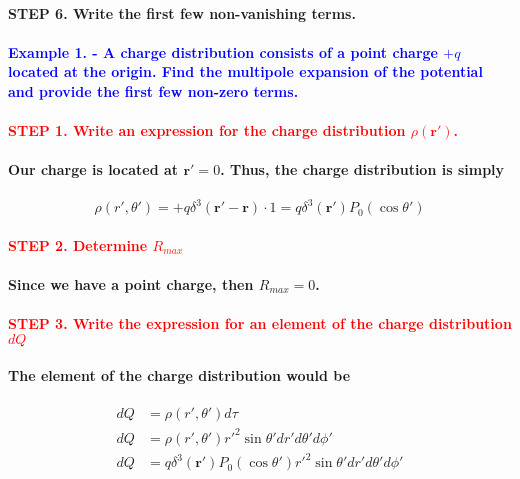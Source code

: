 \documentclass{article}
\begin{document}
\paragraph{STEP 6. Write the first few non-vanishing terms.}
\paragraph{\textcolor{blue}{Example 1. - A charge distribution consists of a point charge $+q$ located at the origin. Find the multipole expansion of the potential and provide the first few non-zero terms.}}
\paragraph{\textcolor{red}{STEP 1. Write an expression for the charge distribution $\rho(\boldsymbol{r}')$.}}
\paragraph{\indent Our charge is located at $\boldsymbol{r}'=0$. Thus, the charge distribution is simply}
\begin{equation*}
    \rho(r',\theta')=+q\delta^3(\boldsymbol{r'-r})\cdot 1=q\delta^3(\boldsymbol{r}')P_0(\cos\theta')
\end{equation*}
\paragraph{\textcolor{red}{STEP 2. Determine $R_{max}$}}
\paragraph{\indent Since we have a point charge, then $R_{max}=0$.}
\paragraph{\textcolor{red}{STEP 3. Write the expression for an element of the charge distribution $dQ$}}
\paragraph{\indent The element of the charge distribution would be }
\begin{align*}
    dQ&=\rho(r',\theta')d\tau\\
    dQ&=\rho(r',\theta')r'^2\sin \theta'dr'd\theta'd\phi'\\
    dQ&=q\delta^3(\boldsymbol{r}')P_0(\cos\theta')r'^2\sin\theta' dr'd\theta'd\phi'
\end{align*}
\end{document}
